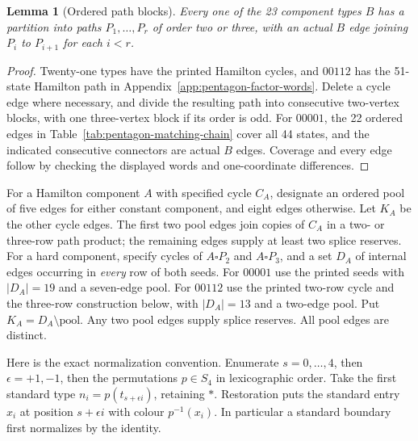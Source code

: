 \documentclass[11pt]{article}
\newtheorem{lemma}[theorem]{Lemma}
\theoremstyle{remark}
\numberwithin{equation}{section}
\numberwithin{table}{section}
\begin{document}
\begin{lemma}[Ordered path blocks]\label{lem:pentagon-path-blocks}
Every one of the 23 component types $B$ has a partition into paths
$P_1,\ldots,P_r$ of order two or three, with an actual $B$ edge
joining $P_i$ to $P_{i+1}$ for each $i<r$.
\end{lemma}
\begin{proof}
Twenty-one types have the printed Hamilton cycles, and $00112$ has
the 51-state Hamilton path in Appendix~\ref{app:pentagon-factor-words}.
Delete a cycle edge where necessary, and divide the resulting path
into consecutive two-vertex blocks, with one three-vertex block if
its order is odd. For $00001$, the 22 ordered edges in
Table~\ref{tab:pentagon-matching-chain} cover all 44 states, and the
indicated consecutive connectors are actual $B$ edges. Coverage and
every edge follow by checking the displayed words and one-coordinate
differences.
\end{proof}

For a Hamilton component $A$ with specified cycle $C_A$, designate an
ordered pool of five edges for either constant component, and eight
edges otherwise. Let $K_A$ be the other cycle edges. The first two
pool edges join copies of $C_A$ in a two- or three-row path product;
the remaining edges supply at least two splice reserves.
For a hard component, specify cycles of $A\square P_2$ and
$A\square P_3$, and a set $D_A$ of internal edges occurring in
\emph{every} row of both seeds. For $00001$ use the printed seeds
with $|D_A|=19$ and a seven-edge pool. For $00112$ use the printed
two-row cycle and the three-row construction below, with
$|D_A|=13$ and a two-edge pool. Put $K_A=D_A\setminus\text{pool}$.
Any two pool edges supply splice reserves. All pool edges are distinct.

Here is the exact normalization convention. Enumerate $s=0,\ldots,4$,
then $\epsilon=+1,-1$, then the permutations $p\in S_4$ in lexicographic
order. Take the first standard type
$n_i=p(t_{s+\epsilon i})$, retaining $\ast$. Restoration puts the
standard entry $x_i$ at position $s+\epsilon i$ with colour $p^{-1}(x_i)$.
In particular a standard boundary first normalizes by the identity.
\end{document}
